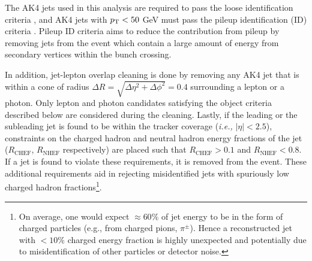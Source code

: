 The AK4 jets used in this analysis are required to pass the 
loose identification criteria \cite{CMS:JME_jetId}, and AK4 jets with $p_{\textrm{T}} < 50$ GeV 
must pass the pileup identification (ID) criteria \cite{CMS:JME_jetPuID}. 
Pileup ID criteria aims to reduce the contribution from
pileup by removing jets from the event which contain a large amount of energy from secondary vertices
within the bunch crossing.



In addition, jet-lepton overlap cleaning is done by removing any AK4 jet that is within a cone of radius
$\Delta R = \sqrt{\Delta \eta^2 + \Delta \phi^2} = 0.4$ surrounding a lepton or a photon. Only lepton and 
photon candidates satisfying the object criteria described below are considered during the cleaning.
Lastly, if the leading or the subleading jet is found to be within the tracker coverage (\textit{i.e.,} $|\eta| < 2.5$),
constraints on the charged hadron and neutral hadron energy fractions of the jet ($R_{\textrm{CHEF}}$, $R_{\textrm{NHEF}}$ respectively) 
are placed such that $R_{\textrm{CHEF}} > 0.1$ and 
$R_{\textrm{NHEF}} < 0.8$. If a jet is found to violate these requirements, it is removed from the event.
These additional requirements aid in rejecting misidentified jets with spuriously low charged hadron 
fractions\footnote{On average, one would expect $\approx 60\%$ of jet energy to be in the form of charged particles
(e.g., from charged pions, $\pi^{\pm}$). Hence a reconstructed jet with $<10 \%$ charged energy fraction is highly unexpected and potentially 
due to misidentification of other particles or detector noise.}.

